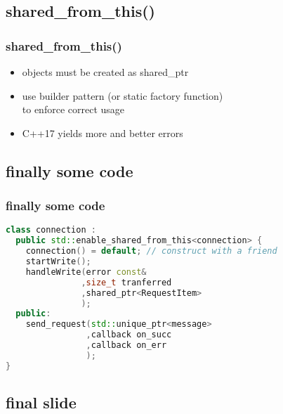 \subsection{shared\_from\_this()}


\begin{frame}[fragile]
 \frametitle{shared\_from\_this()}
  


\vspace{ 0.1 cm }

\begin{itemize}
  \item objects must be created as shared\_ptr
  \item use builder pattern (or static factory function) \\ to enforce correct usage
  \item C++17 yields more and better errors
\end{itemize}
  
\end{frame}

\subsection{finally some code}


\begin{frame}[fragile]
 \frametitle{finally some code}
  

\begin{center}

\begin{lstlisting}[language=c++]
class connection :
  public std::enable_shared_from_this<connection> {
    connection() = default; // construct with a friend
    startWrite();
    handleWrite(error const&
               ,size_t tranferred
               ,shared_ptr<RequestItem>
               );
  public:
    send_request(std::unique_ptr<message>
                ,callback on_succ
                ,callback on_err
                );
}
\end{lstlisting}

\end{center}
  
\end{frame}

\subsection{final slide}


